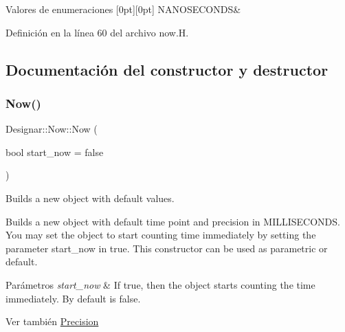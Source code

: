 \begin{DoxyEnumFields}{Valores de enumeraciones}
[0pt][0pt]{}\mbox{\label{class_designar_1_1_now_a3c9f5e57907c88cbe63c70a64638c072a5b3b43ddfdecac6712fd1dbc20798e6b}} 
N\+A\+N\+O\+S\+E\+C\+O\+N\+DS&\\
\hline

\end{DoxyEnumFields}


Definición en la línea 60 del archivo now.\+H.



\subsection{Documentación del constructor y destructor}
\mbox{\label{class_designar_1_1_now_ad96b225953507a5a7853aef2c6b30641}} 
\subsubsection{\texorpdfstring{Now()}{Now()}\hspace{0.1cm}{\footnotesize\ttfamily [1/2]}}
{\footnotesize\ttfamily Designar\+::\+Now\+::\+Now (\begin{DoxyParamCaption}\item[{bool}]{start\+\_\+now = {\ttfamily false} }\end{DoxyParamCaption})\hspace{0.3cm}{\ttfamily [inline]}}



Builds a new object with default values. 

Builds a new object with default time point and precision in M\+I\+L\+L\+I\+S\+E\+C\+O\+N\+DS. You may set the object to start counting time immediately by setting the parameter start\+\_\+now in true. This constructor can be used as parametric or default.


\begin{DoxyParams}{Parámetros}
{\em start\+\_\+now} & If true, then the object starts counting the time immediately. By default is false.\\
\hline
\end{DoxyParams}
\begin{DoxySeeAlso}{Ver también}
\hyperlink{class_designar_1_1_now_a3c9f5e57907c88cbe63c70a64638c072}{Precision} 
\end{DoxySeeAlso}


